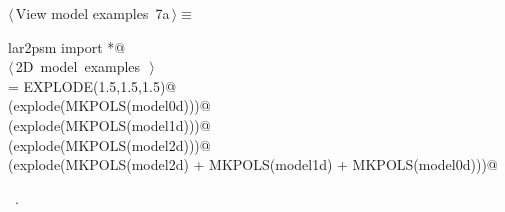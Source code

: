 \documentclass[11pt,oneside]{article}	%
\begin{document}
\begin{flushleft} \small
\begin{minipage}{\linewidth} \label{scrap20}
\protect{}$\langle\,$View model examples\nobreak\ {\footnotesize 7a}$\,\rangle\equiv$
\vspace{-1ex}
\begin{list}{}{} \item
\mbox{}\verb@from lar2psm import *@\\
\mbox{}\verb@@\hbox{$\langle\,$2D model examples\nobreak\ {\footnotesize {}}$\,\rangle$}\verb@@\\
\mbox{}\verb@explode = EXPLODE(1.5,1.5,1.5)@\\
\mbox{}\verb@VIEW(explode(MKPOLS(model0d)))@\\
\mbox{}\verb@VIEW(explode(MKPOLS(model1d)))@\\
\mbox{}\verb@VIEW(explode(MKPOLS(model2d)))@\\
\mbox{}\verb@VIEW(explode(MKPOLS(model2d) + MKPOLS(model1d) + MKPOLS(model0d)))@\\
\mbox{}\verb@@{\NWsep}
\end{list}
\vspace{-1ex}
\footnotesize\addtolength{\baselineskip}{-1ex}
\begin{list}{}{\setlength{\itemsep}{-\parsep}\setlength{\itemindent}{-\leftmargin}}
\item \NWtxtMacroRefIn\ .
\end{list}
\end{minipage}\\[4ex]
\end{flushleft}
\end{document}
